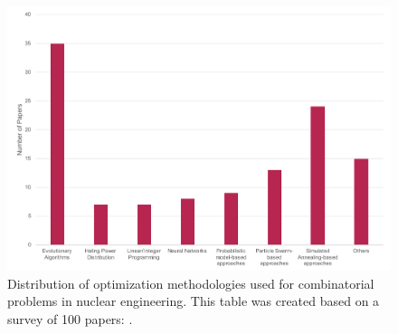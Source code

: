 \documentclass[12pt]{article}
\begin{document}
\begin{figure}
	\includegraphics[width=\textwidth]{methods1}
	\caption{Distribution of optimization methodologies used for combinatorial problems in nuclear engineering. This table was created based on a survey of 100 papers: \cite{Haling:1964,Wall:1965,Sauar:1971,Miller:1975,Motoda:1975,Comes:1988,Okafor:1988,Stillman:1989,Burte:1993,Mahlers:1994,Smuc:1994,Feltus:1995,Stevens:1995,DeChaine:1996,Axmann:1997,Kim:1997,Mahlers:1997,Yamamoto:1997,Lin:1998,Chapot:1999,Francois:1999,Moore:1999,Toshinsky:1999,Karve:2000,Yamamoto:2000,Hongchun:2001,Jagawa:2001,Lee:2001,Kobayashi:2002,Machado:2002,Erdoan:2003,Faria:2003,Sadighi:2003,Yamamoto:2003,Alim:2004,Alim:2004a,Guler:2004,Ortiz:2004,Yamamoto:2004,Ziver:2004,Alim:2005,Francois:2005,Keller:2005,Do:2006,Wang:2006,Castillo:2007,Francois:2007,Hadavi:2007,Hernandez:2007,Keller:2007,Kim:2007,Lima:2007,Park:2007,Alim:2008,Fadaei:2008,Lima:2008,Park:2008,De-Moura-Meneses:2009,Waintraub:2009,Zerovnik:2009,De-Moura-Meneses:2010,Ishida:2010,Shaukat:2010,Zio:2010,Hays:2011,Kropaczek:2011,Norouzi:2011,Oliveira:2011,Ortiz-Servin:2011,Silva:2011,Silva:2011a,Tsvetkov:2011,Yadav:2011,Carlos:2012,Hays:2012,Lin:2012,Liu:2012,Aghaie:2013,Kropaczek:2013,Levine:2013,Wang:2013,Arshi:2014,Carlsen:2014,Hedayat:2014,Khoshahval:2014,Khoshahval:2014a,Lin:2014,Park:2014,Silva:2014,Zameer:2014,Camara-Augusto:2015,De-Moura-Meneses:2015,Hill:2015,Ottinger:2015,Park:2015,Poursalehi:2015,Su:2015,Ayoobian:2016,Hou:2016,Schlunz:2016}.}
	\label{fig:method1}
\end{figure}
\end{document}
